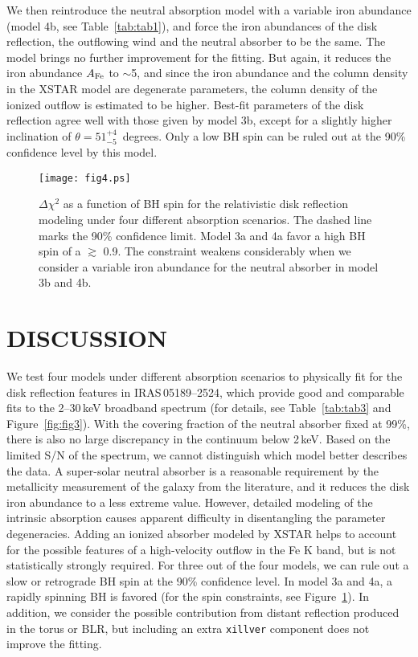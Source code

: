 \documentclass[]{emulateapj}
\begin{document}
We then reintroduce the neutral absorption model with a variable iron abundance (model 4b, see Table~\ref{tab:tab1}), and force the iron abundances of the disk reflection, the outflowing wind and the neutral absorber to be the same. The model brings no further improvement for the fitting. But again, it reduces the iron abundance $A_{\rm Fe}$ to $\sim$5, and since the iron abundance and the column density in the {\small XSTAR} model are degenerate parameters, the column density of the ionized outflow is estimated to be higher.  Best-fit parameters of the disk reflection agree well with those given by model 3b, except for a slightly higher inclination of $\theta = 51^{+4}_{-5}$~degrees. Only a low BH spin can be ruled out at the 90\% confidence level by this model.

\begin{figure}
\centering
\texttt{[image: fig4.ps]}
\caption{$\Delta \chi^{2}$ as a function of BH spin for the relativistic disk reflection modeling under four different absorption scenarios. The dashed line marks the 90\% confidence limit. Model 3a and 4a favor a high BH spin of a $\gtrsim$ 0.9. The constraint weakens considerably when we consider a variable iron abundance for the neutral absorber in model 3b and 4b.
\label{fig:fig4}}
\end{figure}

\section{DISCUSSION}
\label{sec:dis}
We test four models under different absorption scenarios to physically fit for the disk reflection features in {IRAS\,05189--2524}, which provide good and comparable fits to the 2--30\,keV broadband spectrum (for details, see Table~\ref{tab:tab3} and  Figure~\ref{fig:fig3}). With the covering fraction of the neutral absorber fixed at 99\%, there is also no large discrepancy in the continuum below 2\,keV. Based on the limited S/N of the spectrum, we cannot distinguish which model better describes the data. A super-solar neutral absorber is a reasonable requirement by the metallicity measurement of the galaxy from the literature, and it reduces the disk iron abundance to a less extreme value. However, detailed modeling of the intrinsic absorption causes apparent difficulty in disentangling the parameter degeneracies. Adding an ionized absorber modeled by {\small XSTAR} helps to account for the possible features of a high-velocity outflow in the Fe K band, but is not statistically strongly required. For three out of the four models, we can rule out a slow or retrograde BH spin at the 90\% confidence level. In model 3a and 4a, a rapidly spinning BH is favored (for the spin constraints, see Figure~\ref{fig:fig4}). In addition, we consider the possible contribution from distant reflection produced in the torus or BLR, but including an extra {\tt xillver} component does not improve the fitting.
\end{document}
